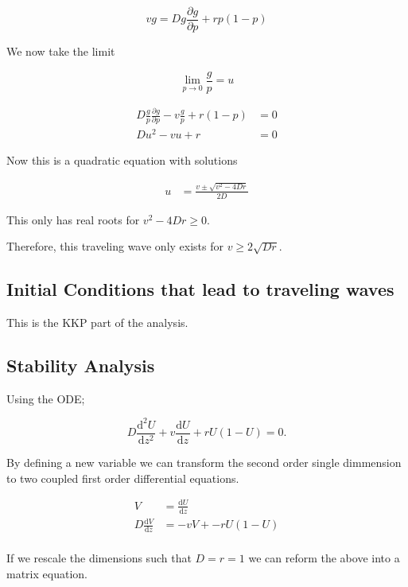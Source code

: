 \documentclass[11pt, a4paper]{article}
\begin{document}
\begin{equation}
vg =  D g \frac{\partial g}{\partial p} + rp(1-p)
\end{equation}

We now take the limit 

$$\lim _{p \rightarrow 0} \frac{g}{p} = u$$

\begin{align*}
D \frac{g}{p} \frac{\partial g}{\partial p} - v \frac{g}{p} + r(1-p) & = 0 \\
D u ^2 - vu + r & = 0 
\end{align*}

Now this is a quadratic equation with solutions 

\begin{align*}
u & = \frac{v \pm \sqrt{v^2 - 4Dr}}{2D}
\end{align*}

This only has real roots for $v^2 - 4Dr \geq 0 $. 

Therefore, this traveling wave only exists for $v \geq 2 \sqrt{Dr}$.

\subsection{Initial Conditions that lead to traveling waves}

This is the KKP part of the analysis. 

\subsection{Stability Analysis}

Using the ODE; 

\begin{equation}
D \frac{\mathrm{d} ^2 U}{\mathrm{d} z^2} + v \frac{\mathrm{d} U}{\mathrm{d} z}  + rU(1-U) =0.
\end{equation}

By defining a new variable we can transform the second order single dimmension to two coupled first order differential equations. 

\begin{align}
V & = \frac{\mathrm{d} U}{\mathrm{d} z} \\
D \frac{\mathrm{d} V}{\mathrm{d} z} & = -v V + -rU(1-U) \\
\end{align}

If we rescale the dimensions such that $D=r=1$ we can reform the above into a matrix equation. 
\end{document}
